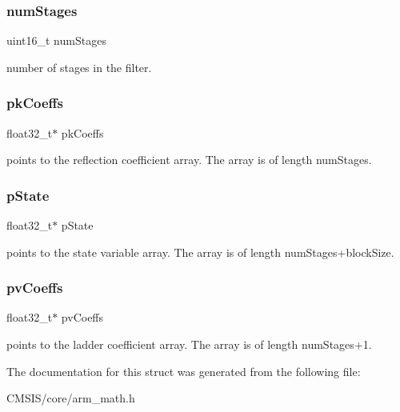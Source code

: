 \subsubsection{\texorpdfstring{num\+Stages}{numStages}}
{\footnotesize\ttfamily uint16\+\_\+t num\+Stages}

number of stages in the filter. \mbox{\label{structarm__iir__lattice__instance__f32_a994889c5c4a866c50a0ee63326378816}} 
\subsubsection{\texorpdfstring{pk\+Coeffs}{pkCoeffs}}
{\footnotesize\ttfamily float32\+\_\+t$\ast$ pk\+Coeffs}

points to the reflection coefficient array. The array is of length num\+Stages. \mbox{\label{structarm__iir__lattice__instance__f32_a335c87e6fdc4b96601d95a5de8b9c463}} 
\subsubsection{\texorpdfstring{p\+State}{pState}}
{\footnotesize\ttfamily float32\+\_\+t$\ast$ p\+State}

points to the state variable array. The array is of length num\+Stages+block\+Size. \mbox{\label{structarm__iir__lattice__instance__f32_a0f8815744fade9c580d44277ff802308}} 
\subsubsection{\texorpdfstring{pv\+Coeffs}{pvCoeffs}}
{\footnotesize\ttfamily float32\+\_\+t$\ast$ pv\+Coeffs}

points to the ladder coefficient array. The array is of length num\+Stages+1. 

The documentation for this struct was generated from the following file\+:\begin{DoxyCompactItemize}
\item 
C\+M\+S\+I\+S/core/arm\+\_\+math.\+h\end{DoxyCompactItemize}
